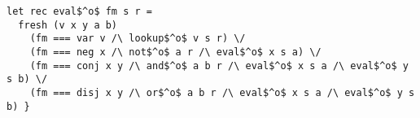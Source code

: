 \lstset{language=ocanren1}

\begin{lstlisting}
let rec eval$^o$ fm s r =
  fresh (v x y a b)
    (fm === var v /\ lookup$^o$ v s r) \/
    (fm === neg x /\ not$^o$ a r /\ eval$^o$ x s a) \/
    (fm === conj x y /\ and$^o$ a b r /\ eval$^o$ x s a /\ eval$^o$ y s b) \/
    (fm === disj x y /\ or$^o$ a b r /\ eval$^o$ x s a /\ eval$^o$ y s b) }
  \end{lstlisting}